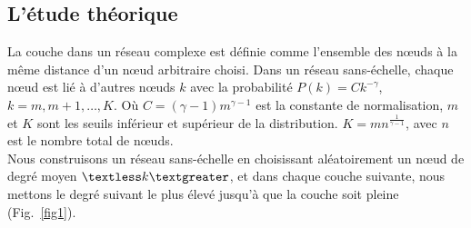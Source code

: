         \subsection{L'étude théorique}
La couche dans un réseau complexe est définie comme l'ensemble des nœuds à la même distance d'un nœud arbitraire choisi. Dans un réseau sans-échelle, chaque nœud est lié à d'autres nœuds $k$ avec la probabilité $P(k)=Ck^{-\gamma}$, $k=m, m + 1, \ldots, K$. Où $C=(\gamma-1)m^{\gamma-1}$ est la constante de normalisation, $m$ et $K$ sont les seuils inférieur et supérieur de la distribution. $K=mn^{\frac{1}{\gamma-1}}$, avec $n$ est le nombre total de nœuds. \\
Nous construisons un réseau sans-échelle en choisissant aléatoirement un nœud de degré moyen $\km$, et dans chaque couche suivante, nous mettons le degré suivant le plus élevé jusqu'à que la couche soit pleine (Fig.~\ref{fig1}).\\
